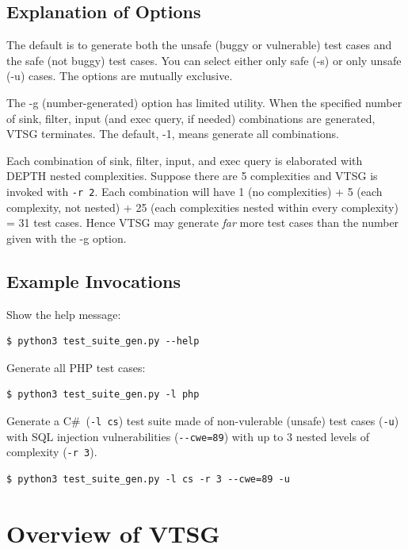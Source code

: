 \documentclass[12pt]{article}
\newcommand{\CSharp}{C{\fontseries{b}\selectfont\#}}
\begin{document}
\subsection{Explanation of Options}

The default is to generate both the unsafe (buggy or vulnerable)
test cases and the safe (not buggy) test cases.  You can select
either only safe (-s) or only unsafe (-u) cases.  The options are
mutually exclusive.

The -g (number-generated) option has limited utility.  When the
specified number of sink, filter, input (and exec query, if needed)
combinations are generated, VTSG terminates.  The default, -1,
means generate all combinations.

Each combination of sink, filter, input, and exec query is elaborated
with DEPTH nested complexities.  Suppose there are 5 complexities
and VTSG is invoked with \verb|-r 2|.  Each combination will have
1 (no complexities) + 5 (each complexity, not nested) + 
25 (each complexities nested within every complexity) = 31 test cases.  
Hence VTSG may generate \emph{far} more test cases than the number
given with the -g option.

\subsection{Example Invocations}

Show the help message:
\begin{verbatim}
$ python3 test_suite_gen.py --help
\end{verbatim}

Generate all PHP test cases:
\begin{verbatim}
$ python3 test_suite_gen.py -l php
\end{verbatim}

Generate a \CSharp\ (\verb|-l cs|) test suite made of non-vulerable (unsafe) test
cases (\verb|-u|) with SQL injection vulnerabilities (\verb|--cwe=89|) 
with up to 3 nested levels of complexity (\verb|-r 3|).
\begin{verbatim}
$ python3 test_suite_gen.py -l cs -r 3 --cwe=89 -u
\end{verbatim}
 
\section{Overview of VTSG}
\end{document}
